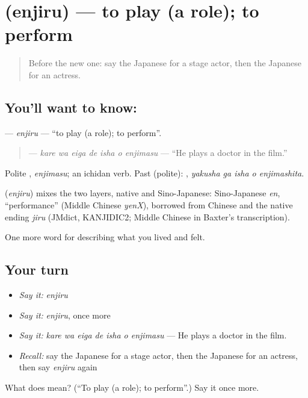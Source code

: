 \section[\texorpdfstring{\ja{えんじる} (enjiru)}{えんじる (enjiru)}]{ (enjiru) — to play (a role); to perform}

\label{lesson:JA-C502-enjiru}



\begin{quote}
Before the new one: say the Japanese for a stage actor, then the Japanese for an actress.
\end{quote}

\subsection*{You'll want to know: }
\textbf{} — \emph{enjiru} — \textquotedblleft{}to play (a role); to perform\textquotedblright{}.

\begin{quote}
\textbf{   } — \emph{kare wa eiga de isha o enjimasu} — \textquotedblleft{}He plays a doctor in the film.\textquotedblright{}
\end{quote}

Polite \textbf{}, \emph{enjimasu}; an ichidan verb. Past (polite): \textbf{  }, \emph{yakusha ga isha o enjimashita}.

\begin{cousinweb}
\textbf{} (\emph{enjiru}) mixes the two layers, native and Sino-Japanese: Sino-Japanese \emph{en}, \textquotedblleft{}performance\textquotedblright{} (Middle Chinese \emph{yenX}), borrowed from Chinese and the native ending \emph{jiru} (JMdict, KANJIDIC2; Middle Chinese in Baxter's transcription).
\end{cousinweb}

\begin{grammarlens}[title={What you've built}]
One more word for describing what you lived and felt.
\end{grammarlens}

\subsection*{Your turn}
\begin{itemize}
\raggedright
  \item \emph{Say it:} \emph{enjiru}
  \item \emph{Say it:} \emph{enjiru}, once more
  \item \emph{Say it:} \emph{kare wa eiga de isha o enjimasu} — He plays a doctor in the film.
  \item \emph{Recall:} say the Japanese for a stage actor, then the Japanese for an actress, then say \emph{enjiru} again
\end{itemize}

\begin{tcolorbox}[breakable,colback=teal!4,colframe=teal!35!black,title={Before you move on}]
What does  mean? (\textquotedblleft{}To play (a role); to perform\textquotedblright{}.) Say it once more.
\end{tcolorbox}
